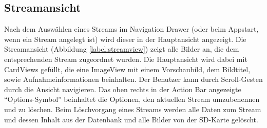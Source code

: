 \subsection{Streamansicht}
Nach dem Auswählen eines Streams im Navigation Drawer (oder beim Appstart, wenn ein Stream angelegt ist) wird dieser in der Hauptansicht angezeigt. Die Streamansicht (Abbildung  \ref{label:streamview}) zeigt alle Bilder an, die dem entsprechenden Stream zugeordnet wurden. Die Hauptansicht wird dabei mit CardViews gefüllt, die eine ImageView mit einem Vorschaubild, dem Bildtitel, sowie Aufnahmeinformationen beinhalten. Der Benutzer kann durch Scroll-Gesten durch die Ansicht navigieren. Das oben rechts in der Action Bar angezeigte \enquote{Options-Symbol} beinhaltet die Optionen, den aktuellen Stream umzubenennen und zu löschen. Beim Löschvorgang eines Streams werden alle Daten zum Stream und dessen Inhalt aus der Datenbank und alle Bilder von der SD-Karte gelöscht.

